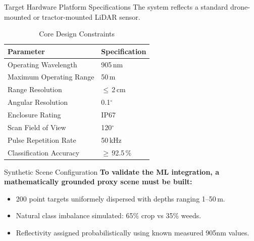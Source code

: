 \documentclass[10pt,aspectratio=169]{beamer}
\begin{document}
\begin{frame}{Target Hardware Platform Specifications}
    The system reflects a standard drone-mounted or tractor-mounted LiDAR sensor.
    \vspace{4mm}
    
    \begin{table}
        \centering
        \caption{Core Design Constraints}
        \small
        \begin{tabular}{ll}
            \toprule
            \textbf{Parameter} & \textbf{Specification} \\
            \midrule
            Operating Wavelength        & 905\,nm \\
            Maximum Operating Range     & 50\,m \\
            Range Resolution            & $\leq$\,2\,cm \\
            Angular Resolution          & 0.1$^\circ{}$ \\
            Enclosure Rating            & IP67 \\
            Scan Field of View          & 120$^\circ{}$ \\
            Pulse Repetition Rate       & 50\,kHz \\
            Classification Accuracy     & $\geq$\,92.5\,\% \\
            \bottomrule
        \end{tabular}
    \end{table}
\end{frame}

\begin{frame}{Synthetic Scene Configuration}
    \textbf{To validate the ML integration, a mathematically grounded proxy scene must be built:}
    
    \begin{itemize}
        \item 200 point targets uniformely dispersed with depths ranging 1--50\,m.
        \item Natural class imbalance simulated: 65\% crop vs 35\% weeds.
        \item Reflectivity assigned probabilistically using known measured 905nm values.
    \end{itemize}
\end{frame}
\end{document}
